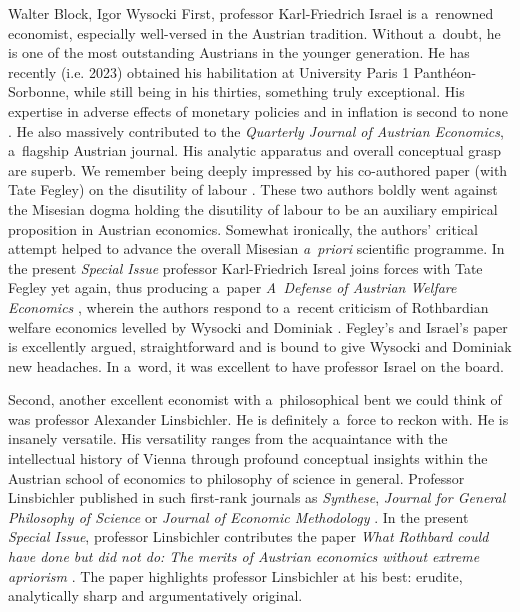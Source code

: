 \begin{editorialeng}{Walter Block, Igor Wysocki}
First, professor Karl-Friedrich Israel is a~renowned economist, especially well-versed in the Austrian tradition. Without a~doubt, he is one of the most outstanding Austrians in the younger generation. He has recently (i.e. 2023) obtained his habilitation at University Paris 1 Panthéon-Sorbonne, while still being in his thirties, something truly exceptional. His expertise in adverse effects of monetary policies and in inflation is second to none 
\parencite[][]{israel_monetary_2022}. %
 He also massively contributed to the \textit{Quarterly Journal of Austrian Economics}, a~flagship Austrian journal. His analytic apparatus and overall conceptual grasp are superb. We remember being deeply impressed by his co-authored paper (with Tate Fegley) on the disutility of labour 
\parencite[][]{fegley_disutility_2020}. %
 These two authors boldly went against the Misesian dogma holding the disutility of labour to be an auxiliary empirical proposition in Austrian economics. Somewhat ironically, the authors' critical attempt helped to advance the overall Misesian \textit{a~priori} scientific programme. In the present \textit{Special Issue} professor Karl-Friedrich Isreal joins forces with Tate Fegley yet again, thus producing a~paper \textit{A~Defense of Austrian Welfare Economics} 
\parencite[][]{fegley_defense_2024}, %
 wherein the authors respond to a~recent criticism of Rothbardian welfare economics levelled by Wysocki and Dominiak 
\parencite*[][]{wysocki_how_2023}. %
 Fegley's and Israel's paper is excellently argued, straightforward and is bound to give Wysocki and Dominiak new headaches. In a~word, it was excellent to have professor Israel on the board.



Second, another excellent economist with a~philosophical bent we could think of was professor Alexander Linsbichler. He is definitely a~force to reckon with. He is insanely versatile. His versatility ranges from the acquaintance with the intellectual history of Vienna through profound conceptual insights within the Austrian school of economics to philosophy of science in general. Professor Linsbichler published in such first-rank journals as \textit{Synthese}, \textit{Journal for General Philosophy of Science} or \textit{Journal of Economic Methodology} 
\parencites[][]{linsbichler_austrian_2021}[][]{linsbichler_otto_2023}[][]{linsbichler_otto_2023}. %
 In the present \textit{Special Issue}, professor Linsbichler contributes the paper \textit{What Rothbard could have done but did not do: The merits of Austrian economics without extreme apriorism} 
\parencite*[][]{linsbichler_what_2024}. %
 The paper highlights professor Linsbichler at his best: erudite, analytically sharp and argumentatively original.




\end{editorialeng}
